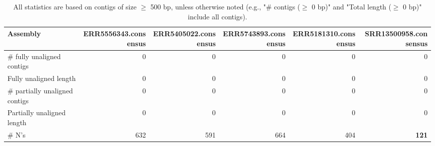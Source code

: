 \documentclass[12pt,a4paper]{article}
\begin{document}
\begin{table}[ht]
\begin{center}
\caption{All statistics are based on contigs of size $\geq$ 500 bp, unless otherwise noted (e.g., "\# contigs ($\geq$ 0 bp)" and "Total length ($\geq$ 0 bp)" include all contigs).}
\begin{tabular}{|l*{5}{|r}|}
\hline
Assembly & ERR5556343.consensus & ERR5405022.consensus & ERR5743893.consensus & ERR5181310.consensus & SRR13500958.consensus \\ \hline
\# fully unaligned contigs & 0 & 0 & 0 & 0 & 0 \\ \hline
Fully unaligned length & 0 & 0 & 0 & 0 & 0 \\ \hline
\# partially unaligned contigs & 0 & 0 & 0 & 0 & 0 \\ \hline
Partially unaligned length & 0 & 0 & 0 & 0 & 0 \\ \hline
\# N's & 632 & 591 & 664 & 404 & {\bf 121} \\ \hline
\end{tabular}
\end{center}
\end{table}
\end{document}
